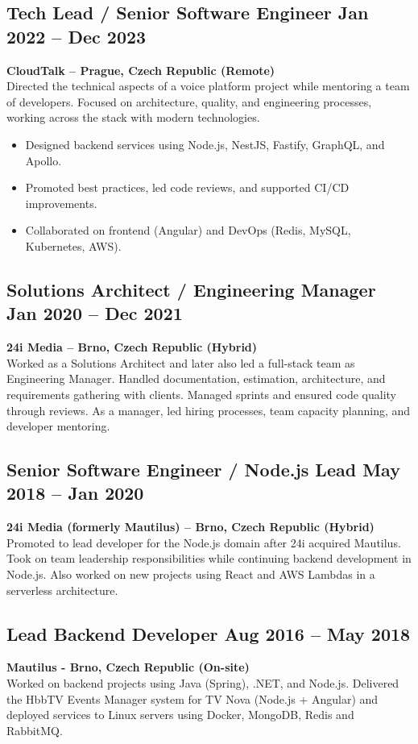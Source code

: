 \documentclass[11pt,a4paper]{article}
\begin{document}
\subsection*{\textbf{Tech Lead / Senior Software Engineer} \hfill Jan 2022 -- Dec 2023}
\textbf{CloudTalk – Prague, Czech Republic (Remote)} \\
Directed the technical aspects of a voice platform project while mentoring a team of developers. Focused on architecture, quality, and engineering processes, working across the stack with modern technologies.

\begin{itemize}[leftmargin=*]
  \item Designed backend services using Node.js, NestJS, Fastify, GraphQL, and Apollo.
  \item Promoted best practices, led code reviews, and supported CI/CD improvements.
  \item Collaborated on frontend (Angular) and DevOps (Redis, MySQL, Kubernetes, AWS).
\end{itemize}

\subsection*{\textbf{Solutions Architect / Engineering Manager} \hfill Jan 2020 -- Dec 2021}
\textbf{24i Media – Brno, Czech Republic (Hybrid)} \\
Worked as a Solutions Architect and later also led a full-stack team as Engineering Manager. Handled documentation, estimation, architecture, and requirements gathering with clients. Managed sprints and ensured code quality through reviews. As a manager, led hiring processes, team capacity planning, and developer mentoring.

\subsection*{{Senior Software Engineer / Node.js Lead} \hfill May 2018 -- Jan 2020}
\textbf{24i Media (formerly Mautilus) – Brno, Czech Republic (Hybrid)} \\
Promoted to lead developer for the Node.js domain after 24i acquired Mautilus. Took on team leadership responsibilities while continuing backend development in Node.js. Also worked on new projects using React and AWS Lambdas in a serverless architecture.

\subsection*{Lead Backend Developer \hfill Aug 2016 -- May 2018}
\textbf{Mautilus - Brno, Czech Republic (On-site)} \\
Worked on backend projects using Java (Spring), .NET, and Node.js. Delivered the HbbTV Events Manager system for TV Nova (Node.js + Angular) and deployed services to Linux servers using Docker, MongoDB, Redis and RabbitMQ.
\end{document}
